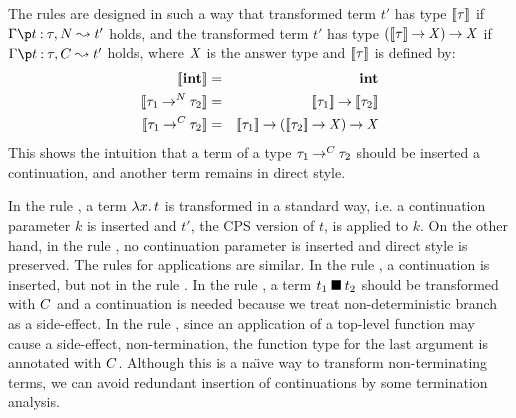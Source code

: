 The rules are designed in such a way that transformed term $t'$ has type
$[\![{\tau}]\!]$ if $\CPS{\Gamma}{t}{\tau}{N}{t'}$ holds, and the transformed
term $t'$ has type ${({[\![{\tau}]\!]}\mathbin{\rightarrow}{\mathit{X}})}\mathbin{\rightarrow}{\mathit{X}}$ if
$\CPS{\Gamma}{t}{\tau}{C}{t'}$ holds, where $\mathit{X}$ is the answer type and
$[\![{\tau}]\!]$ is defined by:
\begin{eqnarray*}
 \CPSty{\INT} &=& \INT \\
 \CPSty{\TFunN{\tau_1}{\tau_2}} &=& \TFun{\CPSty{\tau_1}}{\CPSty{\tau_2}} \\
 \CPSty{\TFunC{\tau_1}{\tau_2}} &=& \TFun{\CPSty{\tau_1}}{\TFun{(\TFun{\CPSty{\tau_2}}{\AT})}{\AT}}
\end{eqnarray*}
This shows the intuition that a term of a type ${\tau_1}\mathbin{\rightarrow^{C}}{\tau_2}$
should be inserted a continuation, and another term remains in direct
style.

In the rule , a term $\lambda{x}.\,{t}$ is transformed in a
standard way, i.e. a continuation parameter $k$ is inserted and $t'$,
the CPS version of $t$, is applied to $k$.  On the other hand, in the
rule , no continuation parameter is inserted and direct
style is preserved.  The rules for applications are similar. In the rule
, a continuation is inserted, but not in the rule
.  In the rule , a term ${t_1}\mathbin{\blacksquare}{t_2}$ should
be transformed with $C$ and a continuation is needed because we treat
non-deterministic branch as a side-effect.
In the rule , since an
application of a top-level function may cause a side-effect,
non-termination, the function type for the last argument is annotated
with $C$.  Although this is a na\"{\i}ve way to transform
non-terminating terms, we can avoid redundant insertion of continuations
by some termination analysis.

